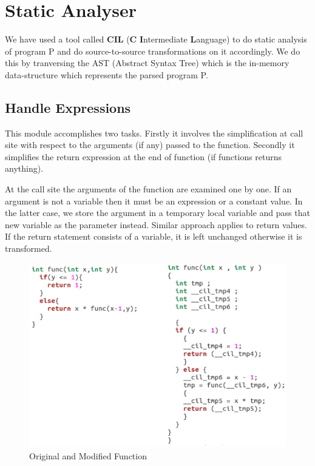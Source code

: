 \documentclass[12pt,oneside]{book}
\begin{document}
\section{Static Analyser}
We have used a tool called \textbf{CIL} (\textbf{C} \textbf{I}ntermediate \textbf{L}anguage) to do static analysis of program P and do source-to-source transformations on it accordingly. We do this by tranversing the AST (Abstract Syntax Tree) which is the in-memory data-structure which represents the parsed program P.

\subsection{Handle Expressions}

This module accomplishes two tasks. Firstly it involves the simplification at call site with respect to the arguments (if any) passed to the function. Secondly it simplifies the return expression at the end of function (if functions returns anything). 

At the call site the arguments of the function are examined one by one. If an argument is not a variable then it must be an expression or a constant value. In the latter case, we store the argument in a temporary local variable and pass that new variable as the parameter instead. Similar approach applies to return values. If the return statement consists of a variable, it is left unchanged otherwise it is transformed.\\

\begin{figure}[htbp]
\centering
\includegraphics[scale=0.55]{handleExp3.png}
\caption{Original and Modified Function}
\end{figure}  
\end{document}
